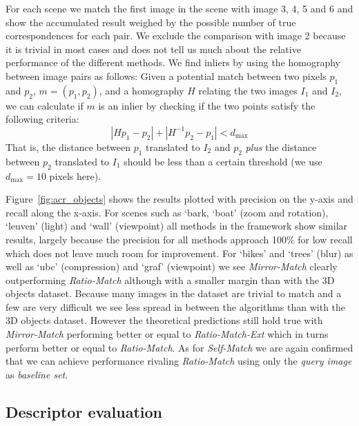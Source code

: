 \documentclass[journal]{IEEEtran}
\begin{document}
For each scene we match the first image in the scene with image 3, 4, 5 
and 6 and show the accumulated result weighed by the possible number of 
true correspondences for each pair. We exclude the comparison with image 
2 because it is trivial in most cases and does not tell us much about 
the relative performance of the different methods. We find inliers by 
using the homography between image pairs as follows: Given a potential 
match between two pixels $p_1$ and $p_2$, $m = \left(p_1, p_2\right)$, 
and a homography $H$ relating the two images $I_1$ and $I_2$, we can 
calculate if $m$ is an inlier by checking if the two points satisfy the 
following criteria:
\begin{equation*}
\left\vert H p_1 - p_2 \right\vert + \left\vert H^{-1}p_2 - p_1 \right\vert < d_{\max}
\end{equation*}
That is, the distance between $p_1$ translated to $I_2$ and $p_2$ 
\emph{plus} the distance between $p_2$ translated to $I_1$ should be 
less than a certain threshold (we use $d_{\max}=10$ pixels here).

Figure~\ref{fig:acr_objects} shows the results plotted with precision on 
the y-axis and recall along the x-axis. For scenes such as `bark, `boat' 
(zoom and rotation), `leuven' (light) and `wall' (viewpoint) all methods 
in the framework show similar results, largely because the precision for 
all methods approach 100\% for low recall which does not leave much room 
for improvement. For `bikes' and `trees' (blur) as well as `ubc'
(compression) and `graf' (viewpoint) we see \emph{Mirror-Match} clearly 
outperforming \emph{Ratio-Match} although with a smaller margin than 
with the 3D objects dataset. Because many images in the dataset are 
trivial to match and a few are very difficult we see less spread in 
between the algorithms than with the 3D objects dataset. However the 
theoretical predictions still hold true with \emph{Mirror-Match} 
performing better or equal to \emph{Ratio-Match-Ext} which in turns 
perform better or equal to \emph{Ratio-Match}. As for \emph{Self-Match} 
we are again confirmed that we can achieve performance rivaling 
\emph{Ratio-Match} using only the \emph{query image} as \emph{baseline 
set}.

\subsection{Descriptor evaluation}
\label{label:desc}
\end{document}
